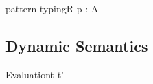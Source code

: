 \begin{rules}{\corelang{} pattern typing}{R \vdash p : A \rhd \Delta}
    \begin{minipage}{.33\linewidth}
    \end{minipage}
    \begin{minipage}{.38\linewidth}
    \end{minipage}
    \begin{minipage}{.33\linewidth}
    \end{minipage}
\end{rules}


\subsection{\corelang{} Dynamic Semantics}
\begin{rules}{Evaluation}{t \longrightarrow t'}
    \begin{minipage}{.95\linewidth}
    \end{minipage}
\end{rules}

